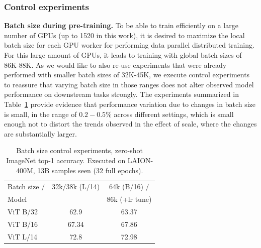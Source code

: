 \begin{appendix}
\subsubsection{Control experiments}
\label{sec:appendix:control_exp}

\textbf{Batch size during pre-training.} To be able to train efficiently on a large number of GPUs (up to 1520 in this work), it is desired to maximize the local batch size for each GPU worker for performing data parallel distributed training. For this large amount of GPUs, it leads to training with global batch sizes of 86K-88K. As we would like to also re-use experiments that were already performed with smaller batch sizes of 32K-45K, we execute control experiments to reassure that varying batch size in those ranges does not alter observed model performance on downstream tasks strongly. The experiments summarized in Table~\ref{tab:batch_size} provide evidence that performance variation due to changes in batch size is small, in the range of $0.2-0.5\%$ across different settings, which is small enough not to distort the trends  observed in the effect of scale, where the changes are substantially larger.


\begin{table}[!htb]
\setlength\tabcolsep{3.0pt}
    \centering
    \small
    \begin{tabular}{lcc}\toprule
       Batch size /  & 32k/38k (L/14) & 64k (B/16) / \\
      Model & & 86k (+lr tune) \\ \midrule
    ViT B/32 & 62.9 & 63.37 \\
    ViT B/16 & 67.34 & 67.86 \\
    ViT L/14 & 72.8 & 72.98 \\\bottomrule
    \end{tabular}
    \caption{
    Batch size control experiments, zero-shot ImageNet top-1 accuracy. Executed on LAION-400M, 13B samples seen (32 full epochs).
    \vspace{-1em}
    }
    \label{tab:batch_size}
\end{table}




\end{appendix}
